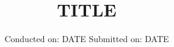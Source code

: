 

\subject{EXPERIMENT NUMBER}
\title{TITLE}
\date{%
  Conducted on: DATE
  \hspace{3em}
  Submitted on: DATE
}



\maketitle
\thispagestyle{empty}
\tableofcontents
\newpage
\setcounter{page}{1}







\printbibliography{}


